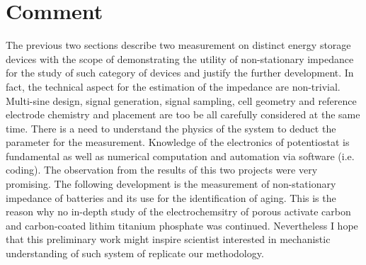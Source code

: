 \section{Comment}
The previous two sections describe two measurement on distinct energy storage devices with the scope of demonstrating the utility of non-stationary impedance for the study of such category of devices and justify the further development. In fact, the technical aspect for the estimation of the impedance are non-trivial. Multi-sine design, signal generation, signal sampling, cell geometry and reference electrode chemistry and placement are too be all carefully considered at the same time. There is a need to understand the physics of the system to deduct the parameter for the measurement. Knowledge of the electronics of potentiostat is fundamental as well as numerical computation and automation via software (i.e. coding). The observation from the results of this two projects were very promising. The following development is the measurement of non-stationary impedance of batteries and its use for the identification of aging. This is the reason why no in-depth study of the electrochemsitry of porous activate carbon and carbon-coated lithim titanium phosphate was continued.  Nevertheless I hope that this preliminary work might inspire scientist interested in mechanistic understanding of such system of replicate our methodology.